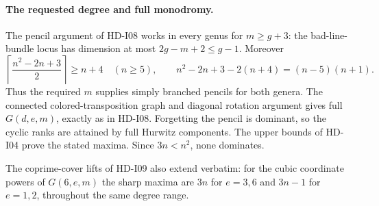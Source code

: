 \paragraph{The requested degree and full monodromy.}
The pencil argument of HD-I08 works in every genus for $m\ge g+3$:
the bad-line-bundle locus has dimension at most $2g-m+2\le g-1$.
Moreover
\[
 \left\lceil\frac{n^2-2n+3}{2}\right\rceil\ge n+4
 \quad(n\ge5),\qquad
 n^2-2n+3-2(n+4)=(n-5)(n+1).
\]
Thus the required $m$ supplies simply branched pencils for both
genera. The connected colored-transposition graph and diagonal
rotation argument gives full $G(d,e,m)$, exactly as in HD-I08.
Forgetting the pencil is dominant, so the cyclic ranks are attained
by full Hurwitz components. The upper bounds of HD-I04 prove the
stated maxima. Since $3n<n^2$, none dominates.

The coprime-cover lifts of HD-I09 also extend verbatim: for the cubic
coordinate powers of $G(6,e,m)$ the sharp maxima are $3n$ for $e=3,6$
and $3n-1$ for $e=1,2$, throughout the same degree range.
